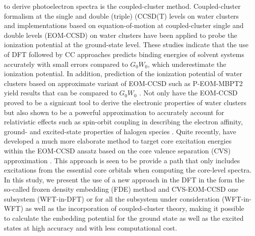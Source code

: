 \documentclass[a4paper,11pt]{report}
\begin{document}
to derive photoelectron spectra is the coupled-cluster method. Coupled-cluster formalism at the single and double (triple) (CCSD(T) levels 
\citep{bartlett2007coupled} on water clusters \citep{blase2016erratum} and implementations based on equation-of-motion at coupled-cluster single and double levels
(EOM-CCSD) \citep{musial2011multireference} on water clusters \citep{lange2018relation} have been applied to probe the ionization potential at the ground-state level.
These studies indicate that the use of DFT followed by CC approaches predicts binding energies of solvent systems accurately with small
errors compared to $G_{0}W_{0}$, which underestimate the ionization potential. In addition, prediction of the ionization potential
of water clusters based on approximate variant of EOM-CCSD \citep{dutta2017assessment,dutta2018lower} such as P-EOM-MBPT2 yield results that can be compared
to $G_{0}W_{0}$ \citep{lange2018relation}. Not only have the EOM-CCSD proved to be a signicant tool to derive the electronic properties of water clusters but
also shown to be a powerful approximation to accurately account for relativistic effects such as spin-orbit coupling in describing the electron affinity, ground- 
and excited-state properties of halogen species \citep{shee2018equation,bouchafra2018predictive}. 
Quite recently, \citep{peng2015energy} have developed a much more elaborate method to target core
excitation energies within the EOM-CCSD ansatz based on the core valence separation (CVS) approximation \citep{cederbaum1980many}. This approach is seen to be
provide a path that only includes excitations from the essential core orbitals when computing the core-level spectra. 
In this study, we present the use of a new approach in the DFT in the form the so-called frozen density embedding (FDE) method and  CVS-EOM-CCSD one subsystem (WFT-in-DFT) \citep{gomes2008calculation,hofener2013solvatochromic,daday2013state} or for all the
subsystem under consideration (WFT-in-WFT) \citep{hofener2012calculation} as well as the incorporation of coupled-cluster theory, making it possible to calculate the embedding potential for the ground state as well as the excited states at high accuracy and with less computational cost.\\
\end{document}
